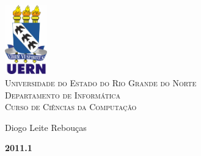\begin{titlepage}
\begin{center}

\includegraphics[height=3cm]{imgs/uern}\\
\vspace{0.25cm}
\textsc{Universidade do Estado do Rio Grande do Norte}\\
\textsc{Departamento de Informática}\\
\textsc{Curso de Ciências da Computação}\\

\vfill

\LARGE
\textbf{\titulo}

\vfill
\normalsize
Diogo Leite Rebouças

\vfill
\large
\textbf{2011.1}

\end{center}
\end{titlepage}
